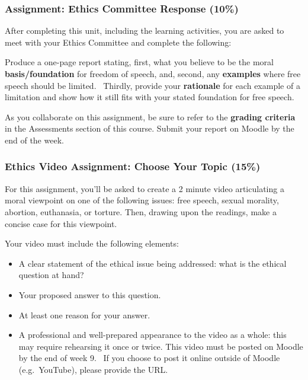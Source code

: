 \documentclass[
]{book}
\providecommand{\tightlist}{%
  \setlength{\itemsep}{0pt}\setlength{\parskip}{0pt}}
\begin{document}
\begin{assessment}
\hypertarget{assignment-ethics-committee-response-10}{%
\subsubsection*{Assignment: Ethics Committee Response (10\%)}\label{assignment-ethics-committee-response-10}}

After completing this unit, including the learning activities, you are asked to
meet with your Ethics Committee and complete the following:

Produce a one-page report stating, first, what you believe to be the moral
\textbf{basis/foundation} for freedom of speech, and, second, any \textbf{examples} where
free speech should be limited. ~Thirdly, provide your \textbf{rationale} for each
example of a limitation and show how it still fits with your stated foundation
for free speech.

As you collaborate on this assignment, be sure to refer to the \textbf{grading
criteria} in the Assessments section of this course. Submit your report on
Moodle by the end of the week.

\hypertarget{ethics-video-assignment-choose-your-topic-15}{%
\subsubsection*{Ethics Video Assignment: Choose Your Topic (15\%)}\label{ethics-video-assignment-choose-your-topic-15}}

For this assignment, you'll be asked to create a 2 minute video articulating a
moral viewpoint on one of the following issues: free speech, sexual morality,
abortion, euthanasia, or torture. Then, drawing upon the
readings, make a concise case for this viewpoint.

Your video must include the following elements:

\begin{itemize}
\tightlist
\item
  A clear statement of the ethical issue being addressed:
  what is the ethical question at hand?
\item
  Your proposed answer to this question.\\
\item
  At least one reason for your answer.\\
\item
  A professional and well-prepared appearance to the video as a whole:
  this may require rehearsing it once or twice. This video must be posted on Moodle by the end of week 9. ~If you choose to post it online outside of Moodle (e.g.~YouTube), please provide the URL.
\end{itemize}
\end{assessment}
\end{document}
